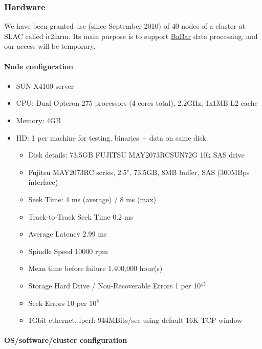 \documentclass[DM,toc]{lsstdoc}
\begin{document}
\subsubsection{Hardware}\label{hardware-ir2farm}

We have been granted use (since September 2010) of 40 nodes of a cluster
at SLAC called ir2farm. Its main purpose is to support
\href{http://www.slac.stanford.edu/BF/}{BaBar} data processing, and our
access will be temporary.

\paragraph{Node configuration}\label{node-configuration}

\begin{itemize}
\item
  SUN X4100 server
\item
  CPU: Dual Opteron 275 processors (4 cores total), 2.2GHz, 1x1MB L2
  cache
\item
  Memory: 4GB
\item
  HD: 1 per machine for testing. binaries + data on same disk.

  \begin{itemize}
  \item
    Disk details: 73.5GB FUJITSU MAY2073RCSUN72G 10k SAS drive
  \item
    Fujitsu MAY2073RC series, 2.5", 73.5GB, 8MB buffer, SAS (300MBps
    interface)
  \item
    Seek Time: 4 ms (average) / 8 ms (max)
  \item
    Track-to-Track Seek Time 0.2 ms
  \item
    Average Latency 2.99 ms
  \item
    Spindle Speed 10000 rpm
  \item
    Mean time before failure 1,400,000 hour(s)
  \item
    Storage Hard Drive / Non-Recoverable Errors 1 per 10$^15$
  \item
    Seek Errors 10 per 10$^8$
  \item
    1Gbit ethernet, iperf: 944MBits/sec using default 16K TCP window
  \end{itemize}
\end{itemize}

\paragraph{OS/software/cluster
configuration}\label{ossoftwarecluster-configuration}
\end{document}
